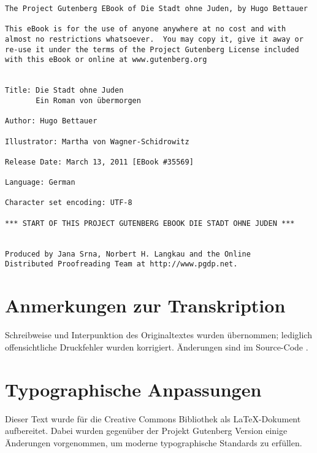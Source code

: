 \usepackage[german,ngerman]{babel}
\usepackage[T1]{fontenc}



\renewcommand*{\tb}[1]{\begin{center}#1\end{center}}
\newcommand*{\latein}[1]{#1}
\newcommand*{\unterschrift}[1]{\begin{flushright}#1\end{flushright}}
\newcommand*{\pagenum}[1]{\marginline{#1}}

\newcommand\Zwickerl{\discretionary{Zwik-}{kerl}{Zwickerl}}


\raggedbottom

\begin{Verbatim}[fontsize=\footnotesize]
The Project Gutenberg EBook of Die Stadt ohne Juden, by Hugo Bettauer

This eBook is for the use of anyone anywhere at no cost and with
almost no restrictions whatsoever.  You may copy it, give it away or
re-use it under the terms of the Project Gutenberg License included
with this eBook or online at www.gutenberg.org


Title: Die Stadt ohne Juden
       Ein Roman von übermorgen

Author: Hugo Bettauer

Illustrator: Martha von Wagner-Schidrowitz

Release Date: March 13, 2011 [EBook #35569]

Language: German

Character set encoding: UTF-8

*** START OF THIS PROJECT GUTENBERG EBOOK DIE STADT OHNE JUDEN ***


Produced by Jana Srna, Norbert H. Langkau and the Online
Distributed Proofreading Team at http://www.pgdp.net.
\end{Verbatim}

\section{Anmerkungen zur Transkription}

Schreibweise und Interpunktion des Originaltextes wurden
übernommen; lediglich offensichtliche Druckfehler wurden
korrigiert. Änderungen sind im Source-Code
.

\section{Typographische Anpassungen}
Dieser Text wurde für die Creative Commons Bibliothek als 
\LaTeX-Dokument aufbereitet. Dabei wurden gegenüber der 
Projekt Gutenberg Version einige Änderungen vorgenommen, um moderne
typographische Standards zu erfüllen.

